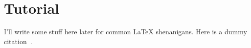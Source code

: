 \section{Tutorial}

I'll write some stuff here later for common LaTeX shenanigans.
Here is a dummy citation~\cite{gu2015certified}.

